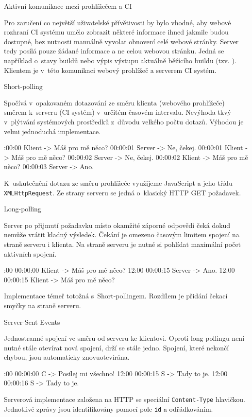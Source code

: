\sec Aktivní komunikace mezi prohlížečem a CI

Pro zaručení co největší uživatelské přívětivosti by bylo vhodné, aby webové rozhraní CI systému umělo zobrazit některé informace ihned jakmile budou dostupné, bez nutnosti manuálně vyvolat obnovení celé webové stránky.
Server tedy posílá pouze žádané informace a ne celou webovou stránku.
Jedná se například o~stavy buildů nebo výpis výstupu aktuálně běžícího buildu (tzv. ).
Klientem je v~této komunikaci webový prohlížeč a serverem CI systém.

\secc Short-polling

Spočívá v~opakovaném dotazování ze směru klienta (webového prohlížeče) směrem k~serveru (CI systém) v~určitém časovém intervalu.
Nevýhoda tkvý v~plýtvání systémových prostředků z~důvodu velkého počtu dotazů.
Výhodou je velmi jednoduchá implementace.

:00:00 Klient -> Máš pro mě něco?
00:00:01 Server -> Ne, čekej.
00:00:01 Klient -> Máš pro mě něco?
00:00:02 Server -> Ne, čekej.
00:00:02 Klient -> Máš pro mě něco?
00:00:03 Server -> Ano.
\endtt

\noindent
K~uskutečnění dotazu ze směru prohlížeče využijeme JavaScript a jeho třídu {\tt XMLHttpRequest}.
Ze strany serveru se jedná o~klasický HTTP GET požadavek.

\secc Long-polling

Server po přijmutí požadavku místo okamžité záporné odpovědi čeká dokud nemůže vrátit kladný výsledek.
Čekání je omezeno časovým limitem spojení na straně serveru i klienta.
Na straně serveru je nutné si pohlídat maximální počet aktivních spojení.

:00 00:00:00 Klient -> Máš pro mě něco?
12:00 00:00:15 Server -> Ano.
12:00 00:00:15 Klient -> Máš pro mě něco?
\endtt

\noindent
Implementace témeř totožná s~Short-pollingem.
Rozdílem je přidání čekací smyčky na straně serveru.

\secc Server-Sent Events

Jednostranné spojení ve směru od serveru ke klientovi.
Oproti long-pollingu není nutné stále otevírat nová spojení, drží se stále jedno.
Spojení, které nekončí chybou, jsou automaticky znovuotevírána.

:00 00:00:00 C -> Posílej mi všechno!
12:00 00:00:15 S -> Tady to je.
12:00 00:00:16 S -> Tady to je.
\endtt

\noindent
Serverová implementace založena na HTTP se speciální {\tt Content-Type} hlavičkou.
Jednotlivé zprávy jsou identifikovány pomocí pole {\tt id} a odřádkováním.

